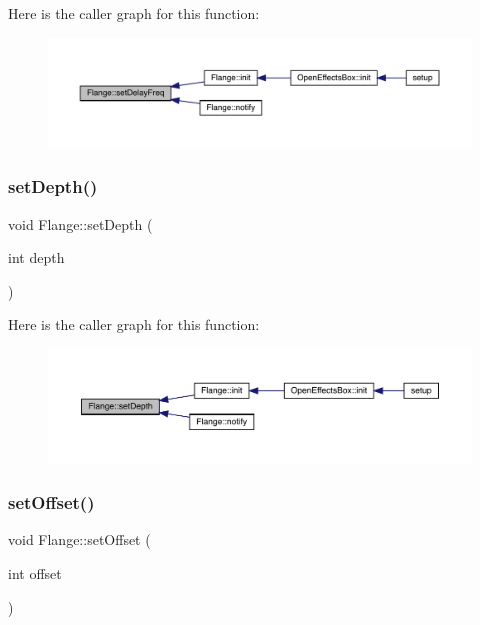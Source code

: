 Here is the caller graph for this function\+:\nopagebreak
\begin{figure}[H]
\begin{center}
\leavevmode
\includegraphics[width=350pt]{class_flange_af132f265ce1567691ffa2ce29bb512c6_icgraph}
\end{center}
\end{figure}
\mbox{\label{class_flange_a34ba641893065a297d5fe767a1fa2fc4}} 
\subsubsection{\texorpdfstring{set\+Depth()}{setDepth()}}
{\footnotesize\ttfamily void Flange\+::set\+Depth (\begin{DoxyParamCaption}\item[{int}]{depth }\end{DoxyParamCaption})}

Here is the caller graph for this function\+:\nopagebreak
\begin{figure}[H]
\begin{center}
\leavevmode
\includegraphics[width=350pt]{class_flange_a34ba641893065a297d5fe767a1fa2fc4_icgraph}
\end{center}
\end{figure}
\mbox{\label{class_flange_a733bc8118f327fc4c31c896642ad49ad}} 
\subsubsection{\texorpdfstring{set\+Offset()}{setOffset()}}
{\footnotesize\ttfamily void Flange\+::set\+Offset (\begin{DoxyParamCaption}\item[{int}]{offset }\end{DoxyParamCaption})}

